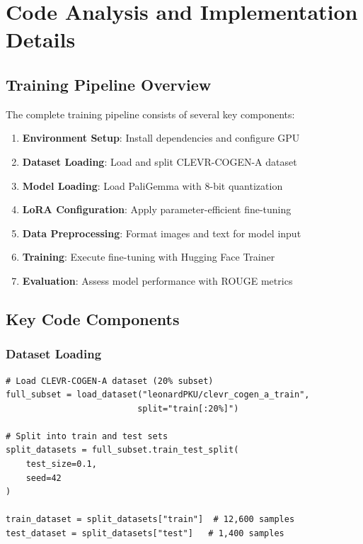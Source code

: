 \documentclass[conference]{IEEEtran}
\begin{document}
\section{Code Analysis and Implementation Details}

\subsection{Training Pipeline Overview}

The complete training pipeline consists of several key components:

\begin{enumerate}
    \item \textbf{Environment Setup}: Install dependencies and configure GPU
    \item \textbf{Dataset Loading}: Load and split CLEVR-COGEN-A dataset
    \item \textbf{Model Loading}: Load PaliGemma with 8-bit quantization
    \item \textbf{LoRA Configuration}: Apply parameter-efficient fine-tuning
    \item \textbf{Data Preprocessing}: Format images and text for model input
    \item \textbf{Training}: Execute fine-tuning with Hugging Face Trainer
    \item \textbf{Evaluation}: Assess model performance with ROUGE metrics
\end{enumerate}

\subsection{Key Code Components}

\subsubsection{Dataset Loading}

\begin{lstlisting}[caption={Dataset Loading and Splitting}]
# Load CLEVR-COGEN-A dataset (20% subset)
full_subset = load_dataset("leonardPKU/clevr_cogen_a_train", 
                          split="train[:20%]")

# Split into train and test sets
split_datasets = full_subset.train_test_split(
    test_size=0.1, 
    seed=42
)

train_dataset = split_datasets["train"]  # 12,600 samples
test_dataset = split_datasets["test"]   # 1,400 samples
\end{lstlisting}
\end{document}

